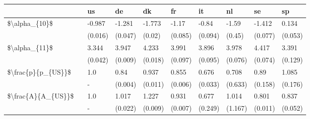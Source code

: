 \begin{tabular}{llllllllll}
\toprule
                   & {} &       us &       de &       dk &       fr &       it &       nl &       se &       sp \\
\midrule
\$\textbackslash alpha\_\{10\}\$ & {} &   -0.987 &   -1.281 &   -1.773 &    -1.17 &    -0.84 &    -1.59 &   -1.412 &    0.134 \\
                   & {} &  (0.016) &  (0.047) &   (0.02) &  (0.085) &  (0.094) &   (0.45) &  (0.077) &  (0.053) \\
\$\textbackslash alpha\_\{11\}\$ & {} &    3.344 &    3.947 &    4.233 &    3.991 &    3.896 &    3.978 &    4.417 &    3.391 \\
                   & {} &  (0.042) &  (0.009) &  (0.018) &  (0.097) &  (0.095) &  (0.076) &  (0.074) &  (0.129) \\
\$\textbackslash frac\{p\}\{p\_\{US\}\}\$ & {} &      1.0 &     0.84 &    0.937 &    0.855 &    0.676 &    0.708 &     0.89 &    1.085 \\
                   & {} &        - &  (0.004) &  (0.011) &  (0.006) &  (0.033) &  (0.633) &  (0.158) &  (0.176) \\
\$\textbackslash frac\{A\}\{A\_\{US\}\}\$ & {} &      1.0 &    1.017 &    1.227 &    0.931 &    0.677 &    1.014 &    0.801 &    0.837 \\
                   & {} &        - &  (0.022) &  (0.009) &  (0.007) &  (0.249) &  (1.167) &  (0.011) &  (0.052) \\
\bottomrule
\end{tabular}
